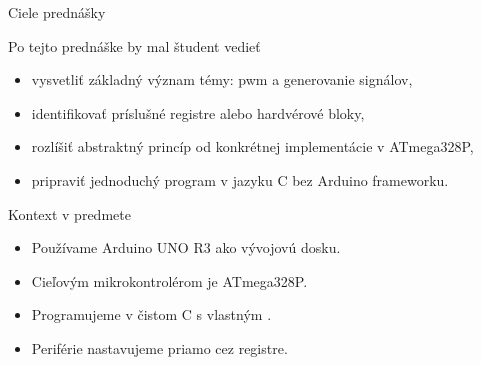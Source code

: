 
\begin{frame}{Ciele prednášky}
\begin{tukebox}{Po tejto prednáške by mal študent vedieť}
\begin{itemize}
    \item vysvetliť základný význam témy: pwm a generovanie signálov,
    \item identifikovať príslušné registre alebo hardvérové bloky,
    \item rozlíšiť abstraktný princíp od konkrétnej implementácie v ATmega328P,
    \item pripraviť jednoduchý program v jazyku C bez Arduino frameworku.
\end{itemize}
\end{tukebox}
\end{frame}

\begin{frame}{Kontext v predmete}
\begin{itemize}
    \item Používame Arduino UNO R3 ako vývojovú dosku.
    \item Cieľovým mikrokontrolérom je ATmega328P.
    \item Programujeme v čistom C s vlastným .
    \item Periférie nastavujeme priamo cez registre.
\end{itemize}
\end{frame}
